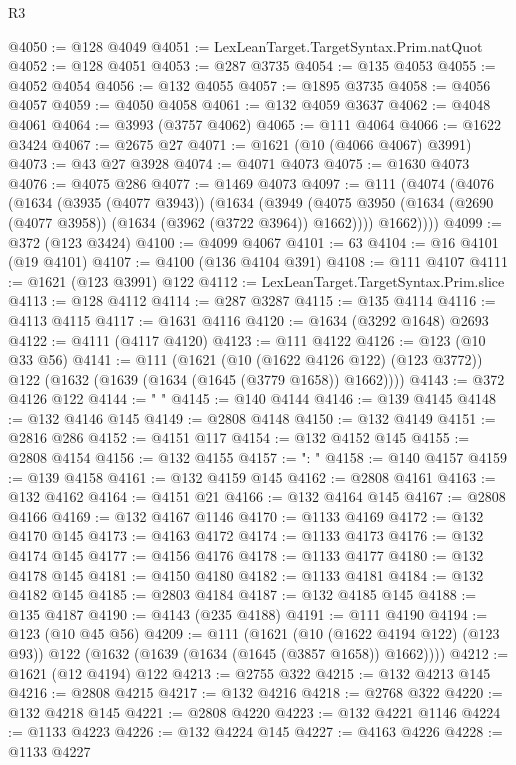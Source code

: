 \begin{lexlean}{R3}
\begin{coremodule}
@4050 := @128 @4049
@4051 := LexLeanTarget.TargetSyntax.Prim.natQuot
@4052 := @128 @4051
@4053 := @287 @3735
@4054 := @135 @4053
@4055 := @4052 @4054
@4056 := @132 @4055
@4057 := @1895 @3735
@4058 := @4056 @4057
@4059 := @4050 @4058
@4061 := @132 @4059 @3637
@4062 := @4048 @4061
@4064 := @3993 (@3757 @4062)
@4065 := @111 @4064
@4066 := @1622 @3424
@4067 := @2675 @27
@4071 := @1621 (@10 (@4066 @4067) @3991)
@4073 := @43 @27 @3928
@4074 := @4071 @4073
@4075 := @1630 @4073
@4076 := @4075 @286
@4077 := @1469 @4073
@4097 := @111
    (@4074
      (@4076
        (@1634
          (@3935 (@4077 @3943))
          (@1634
            (@3949 (@4075 @3950 (@1634 (@2690 (@4077 @3958)) (@1634 (@3962 (@3722 @3964)) @1662))))
            @1662))))
@4099 := @372 (@123 @3424)
@4100 := @4099 @4067
@4101 := 63
@4104 := @16 @4101 (@19 @4101)
@4107 := @4100 (@136 @4104 @391)
@4108 := @111 @4107
@4111 := @1621 (@123 @3991) @122
@4112 := LexLeanTarget.TargetSyntax.Prim.slice
@4113 := @128 @4112
@4114 := @287 @3287
@4115 := @135 @4114
@4116 := @4113 @4115
@4117 := @1631 @4116
@4120 := @1634 (@3292 @1648) @2693
@4122 := @4111 (@4117 @4120)
@4123 := @111 @4122
@4126 := @123 (@10 @33 @56)
@4141 := @111
    (@1621
      (@10 (@1622 @4126 @122) (@123 @3772))
      @122
      (@1632 (@1639 (@1634 (@1645 (@3779 @1658)) @1662))))
@4143 := @372 @4126 @122
@4144 := "      "
@4145 := @140 @4144
@4146 := @139 @4145
@4148 := @132 @4146 @145
@4149 := @2808 @4148
@4150 := @132 @4149
@4151 := @2816 @286
@4152 := @4151 @117
@4154 := @132 @4152 @145
@4155 := @2808 @4154
@4156 := @132 @4155
@4157 := ": "
@4158 := @140 @4157
@4159 := @139 @4158
@4161 := @132 @4159 @145
@4162 := @2808 @4161
@4163 := @132 @4162
@4164 := @4151 @21
@4166 := @132 @4164 @145
@4167 := @2808 @4166
@4169 := @132 @4167 @1146
@4170 := @1133 @4169
@4172 := @132 @4170 @145
@4173 := @4163 @4172
@4174 := @1133 @4173
@4176 := @132 @4174 @145
@4177 := @4156 @4176
@4178 := @1133 @4177
@4180 := @132 @4178 @145
@4181 := @4150 @4180
@4182 := @1133 @4181
@4184 := @132 @4182 @145
@4185 := @2803 @4184
@4187 := @132 @4185 @145
@4188 := @135 @4187
@4190 := @4143 (@235 @4188)
@4191 := @111 @4190
@4194 := @123 (@10 @45 @56)
@4209 := @111
    (@1621
      (@10 (@1622 @4194 @122) (@123 @93))
      @122
      (@1632 (@1639 (@1634 (@1645 (@3857 @1658)) @1662))))
@4212 := @1621 (@12 @4194) @122
@4213 := @2755 @322
@4215 := @132 @4213 @145
@4216 := @2808 @4215
@4217 := @132 @4216
@4218 := @2768 @322
@4220 := @132 @4218 @145
@4221 := @2808 @4220
@4223 := @132 @4221 @1146
@4224 := @1133 @4223
@4226 := @132 @4224 @145
@4227 := @4163 @4226
@4228 := @1133 @4227

\end{coremodule}
\end{lexlean}
